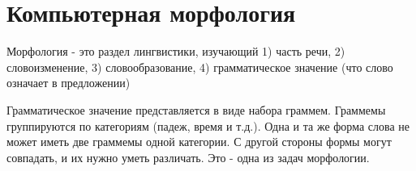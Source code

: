 \section{Компьютерная морфология} \label{sect_review_comp_morphology}

Морфология - это раздел лингвистики, изучающий 
1) часть речи,
2) словоизменение,
3) словообразование,
4) грамматическое значение (что слово означает в предложении)

Грамматическое значение представляется в виде набора граммем. Граммемы группируются по категориям (падеж, время и т.д.). Одна и та же форма слова не может иметь две граммемы одной категории. С другой стороны формы могут совпадать, и их нужно уметь различать. Это - одна из задач морфологии.